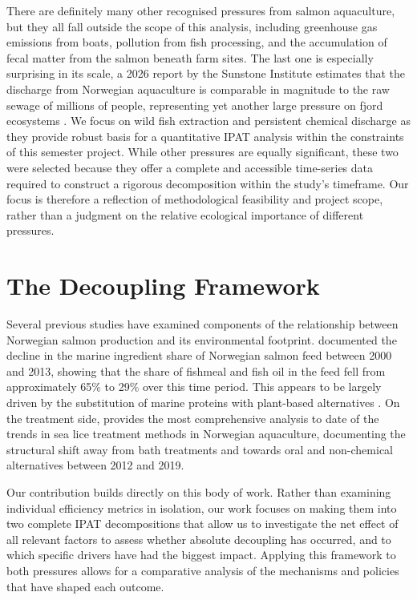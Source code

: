 \documentclass[12pt, a4paper]{report}
\begin{document}
There are definitely many other recognised pressures from salmon aquaculture, but they all fall outside the scope of this analysis, including greenhouse gas emissions from boats, pollution from fish processing, and the accumulation of fecal matter from the salmon beneath farm sites. The last one is especially surprising in its scale, a 2026 report by the Sunstone Institute estimates that the discharge from Norwegian aquaculture is comparable in magnitude to the raw sewage of millions of people, representing yet another large pressure on fjord ecosystems \citep{sunstone2026, guardian2026}. We focus on wild fish extraction and persistent chemical discharge as they 
provide robust basis for a quantitative IPAT analysis within the 
constraints of this semester project. While other pressures are equally 
significant, these two were selected because they offer a complete 
and accessible time-series data required to construct a rigorous decomposition 
within the study's timeframe. Our focus is therefore a reflection of 
methodological feasibility and project scope, rather than a judgment on the 
relative ecological importance of different pressures.



\section{The Decoupling Framework}

Several previous studies have examined components of the relationship between
Norwegian salmon production and its environmental footprint.
\citet{ytrestoeyl2015} documented the decline in the marine
ingredient share of Norwegian salmon feed between 2000 and 2013, showing
that the share of fishmeal and fish oil in the feed fell from
approximately 65\% to 29\% over this time period. This appears to be largely driven by the substitution of marine proteins with plant-based alternatives \citep{tacon2008}. On the treatment side, \citet{myhrjensen2020} provides the
most comprehensive analysis to date of the trends in sea lice treatment
methods in Norwegian aquaculture, documenting the structural shift away
from bath treatments and towards oral and non-chemical alternatives
between 2012 and 2019.

Our contribution builds directly on this body of work. Rather than examining individual efficiency metrics in isolation, our work focuses on making them into two complete IPAT decompositions that allow us to investigate the net effect of all relevant factors to assess whether absolute decoupling has occurred, and to which specific drivers have had the biggest impact. Applying this framework to both pressures allows for a comparative analysis of the mechanisms and policies that have shaped each outcome.
\end{document}
